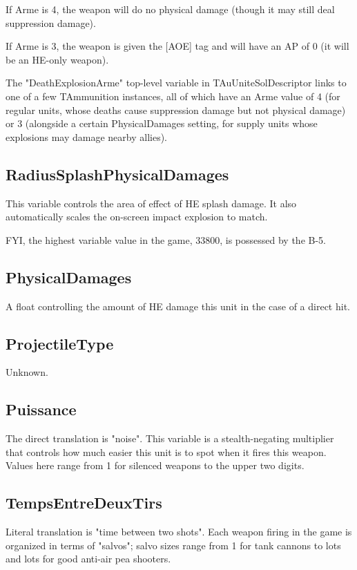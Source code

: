 \documentclass{article}
\begin{document}
If Arme is 4, the weapon will do no physical damage (though it may still deal suppression damage).

If Arme is 3, the weapon is given the [AOE] tag and will have an AP of 0 (it will be an HE-only weapon).

The "DeathExplosionArme" top-level variable in TAuUniteSolDescriptor links to one of a few TAmmunition instances, all of which have an Arme value of 4 (for regular units, whose deaths cause suppression damage but not physical damage) or 3 (alongside a certain PhysicalDamages setting, for supply units whose explosions may damage nearby allies).

\subsection{RadiusSplashPhysicalDamages}

This variable controls the area of effect of HE splash damage. It also automatically scales the on-screen impact explosion to match.

FYI, the highest variable value in the game, 33800, is possessed by the B-5.

\subsection{PhysicalDamages}

A float controlling the amount of HE damage this unit in the case of a direct hit.

\subsection{ProjectileType}

Unknown.

\subsection{Puissance}

The direct translation is "noise". This variable is a stealth-negating multiplier that controls how much easier this unit is to spot when it fires this weapon. Values here range from 1 for silenced weapons to the upper two digits.

\subsection{TempsEntreDeuxTirs}

Literal translation is "time between two shots". Each weapon firing in the game is organized in terms of "salvos"; salvo sizes range from 1 for tank cannons to lots and lots for good anti-air pea shooters.
\end{document}
